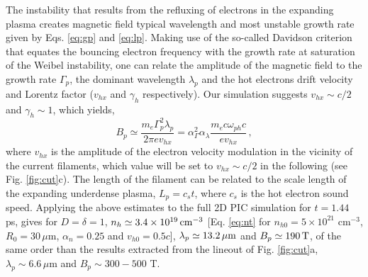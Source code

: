 \documentclass[aps,showpacs,superscriptaddress]{revtex4}
\begin{document}
The instability that results from the refluxing of electrons in the expanding plasma creates magnetic field typical wavelength and most unstable growth rate given by Eqs.  \eqref{eq:gp} and \eqref{eq:lp}.
Making use of the so-called Davidson criterion \cite[]{POF_Davidson_1972} that equates the bouncing electron frequency with the growth rate at saturation of the Weibel instability, one can relate the amplitude of the magnetic field to the growth rate $\Gamma_p$,  the dominant wavelength  $\lambda_p$ and  the hot electrons drift velocity and Lorentz factor ($v_{hx}$ and $\gamma_h$ respectively). Our simulation suggests $v_{hx}\sim c/2$ and $\gamma_h \sim 1$, which yields,
\begin{equation}\label{eq:bp}
B_p \simeq \frac{m_e \Gamma_p^2 \lambda_p}{2\pi e v_{hx}} =   \alpha_\Gamma^2 \alpha_\lambda   \frac{m_ec\omega_{ph}c}{ e v_{hx}} \, ,
\end{equation}
where $v_{hx}$ is the amplitude of the electron velocity modulation in the vicinity of the current filaments, which value will be set to $v_{hx}\sim c/2$ in the following (see Fig. \ref{fig:cut}c).
The length of the filament can be related to the scale length of the expanding underdense plasma, $L_p = c_{s} t$, where $c_{s}$ is the hot electron sound speed.
Applying the above estimates to the full 2D PIC simulation for $t = 1.44$ ps, gives for $D=\delta=1$, 
 $n_h \simeq 3.4 \times 10^{19}\,\rm cm^{-3}$ [Eq. \eqref{eq:nt} for $n_{h0}=5\times 10^{21}$  cm$^{-3}$, $R_0=30\, \mu$m, $\alpha_n = 0.25$ and $v_{h0}=0.5c$],  $\lambda_p \simeq 13.2 \,\rm \mu m$ and  $B_p \simeq 190\,\rm T$, of the same order than  the results extracted from the lineout of Fig. \ref{fig:cut}a,  $\lambda_p \sim 6.6 \, \mu$m 
and  $B_p \sim 300-500$ T.
\end{document}
